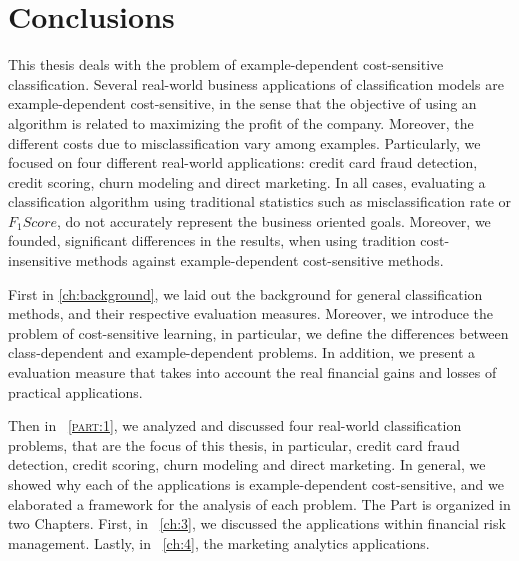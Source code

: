 \chapter{Conclusions}\label{ch:10}

This thesis deals with the problem of example-dependent cost-sensitive classification.
Several real-world business applications of classification models are example-dependent 
cost-sensitive, in the sense that the objective of using an algorithm is related to maximizing the 
profit of the company. Moreover, the different costs due to misclassification vary among examples. 
Particularly, we focused on four different real-world applications: credit card fraud 
detection, credit scoring, churn modeling and direct marketing. In all cases, evaluating a 
classification algorithm using traditional statistics such as misclassification rate or $F_1Score$, 
do not accurately represent the business oriented goals. Moreover, we founded, significant 
differences in the results, when using tradition cost-insensitive methods against example-dependent 
cost-sensitive methods.

First in \chaptername{ \ref{ch:background}}, we laid out the background for general classification 
methods, and their respective evaluation measures. Moreover, we introduce the problem of 
cost-sensitive learning, in particular, we define the differences between class-dependent and 
example-dependent problems. In addition, we present a evaluation measure that takes into account 
the real financial gains and losses of practical applications.

Then in \partname{~\textsc{\ref{part:1}}}, we analyzed and discussed four real-world 
classification problems, that are the focus of this thesis, in particular, credit card fraud 
detection, credit scoring, churn modeling and direct marketing. In general, we showed why each of 
the applications is example-dependent cost-sensitive, and we elaborated a framework for the 
analysis of each problem. The Part is organized in two Chapters. First, in 
\chaptername{~\ref{ch:3}}, we discussed the applications within financial risk management. Lastly, 
in \chaptername{~\ref{ch:4}}, the marketing analytics applications.

